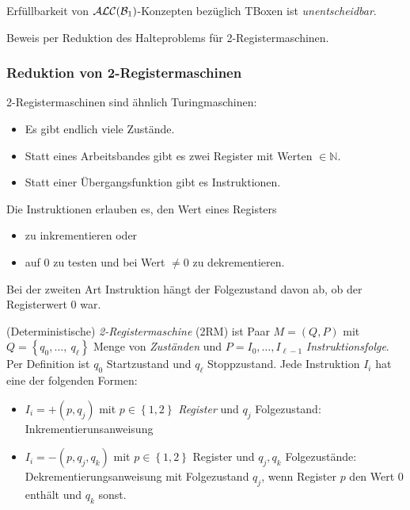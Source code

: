 \begin{theorem}\label{thm:531}
    Erfüllbarkeit von $\mathcal{A}\mathcal{L}\mathcal{C}(\mathcal{B}_1)$-Konzepten bezüglich TBoxen ist \emph{unentscheidbar}.
\end{theorem}

Beweis per Reduktion des Halteproblems für 2-Registermaschinen.

\subsubsection{Reduktion von 2-Registermaschinen}

2-Registermaschinen sind ähnlich Turingmaschinen:
\begin{itemize}
    \item Es gibt endlich viele Zustände.
    \item Statt eines Arbeitsbandes gibt es zwei Register mit Werten $\in \mathbb{N}$.
    \item Statt einer Übergangsfunktion gibt es Instruktionen.
\end{itemize}
Die Instruktionen erlauben es, den Wert eines Registers

\begin{itemize}
    \item zu inkrementieren oder
    \item auf 0 zu testen und bei Wert $\neq 0$ zu dekrementieren.
\end{itemize}
Bei der zweiten Art Instruktion hängt der Folgezustand davon ab, ob der Registerwert 0 war.

\begin{definition}[2-Registermaschine]
(Deterministische) \emph{2-Registermaschine} (2RM) ist Paar
$M = \left( Q,P \right)$ mit
$Q = \left\{ q_0,\ldots,\ q_\ell \right\}$ Menge von \emph{Zuständen}
und $P = I_{0},\ldots,I_{\ell - 1}$ \emph{Instruktionsfolge}. Per
Definition ist $q_0$ Startzustand und $q_\ell$ Stoppzustand. Jede
Instruktion $I_{i}$ hat eine der folgenden Formen:

\begin{itemize}
\item
  $I_{i} = + (p,q_j)$ mit $p \in \left\{ 1,2 \right\}$
  \emph{Register} und $q_{j}$ Folgezustand: Inkrementierunsanweisung
\item
  $I_{i} = - (p,q_{j},q_{k})$ mit $p \in \left\{ 1,2 \right\}$
  Register und $q_{j},q_{k}$ Folgezustände: Dekrementierungsanweisung
  mit Folgezustand $q_{j}$, wenn Register $p$ den Wert $0$ enthält
  und $q_{k}$ sonst.
\end{itemize}
\end{definition}

